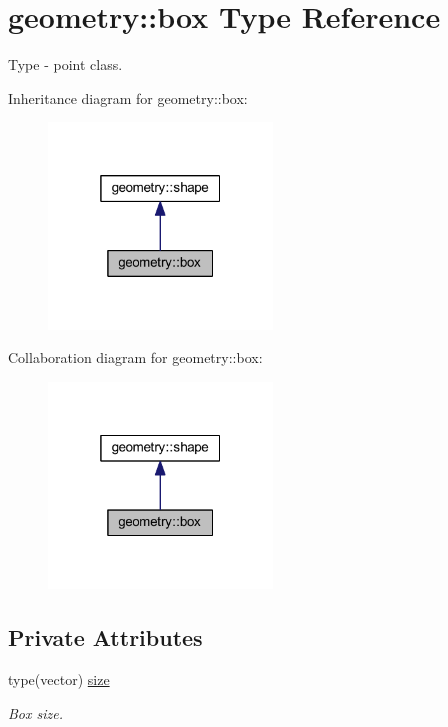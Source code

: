 \hypertarget{structgeometry_1_1box}{}\section{geometry\+:\+:box Type Reference}
\label{structgeometry_1_1box}


Type -\/ point class.  




Inheritance diagram for geometry\+:\+:box\+:\nopagebreak
\begin{figure}[H]
\begin{center}
\leavevmode
\includegraphics[width=169pt]{structgeometry_1_1box__inherit__graph}
\end{center}
\end{figure}


Collaboration diagram for geometry\+:\+:box\+:\nopagebreak
\begin{figure}[H]
\begin{center}
\leavevmode
\includegraphics[width=169pt]{structgeometry_1_1box__coll__graph}
\end{center}
\end{figure}
\subsection*{Private Attributes}
\begin{DoxyCompactItemize}
\item 
type(vector) \mbox{\hyperlink{structgeometry_1_1box_a77c6ce50ff2a5d421ef59cf929f81f3d}{size}}
\begin{DoxyCompactList}\small\item\em Box size. \end{DoxyCompactList}\end{DoxyCompactItemize}



